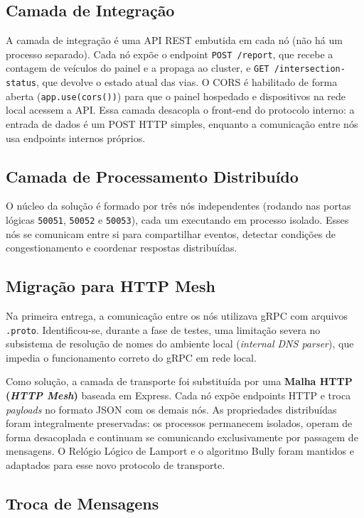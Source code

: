 \documentclass[12pt]{article}
\begin{document}
\subsection{Camada de Integração}

A camada de integração é uma API REST embutida em cada nó (não há um processo separado). Cada nó expõe o endpoint \texttt{POST /report}, que recebe a contagem de veículos do painel e a propaga ao cluster, e \texttt{GET /intersection-status}, que devolve o estado atual das vias. O CORS é habilitado de forma aberta (\texttt{app.use(cors())}) para que o painel hospedado e dispositivos na rede local acessem a API. Essa camada desacopla o front-end do protocolo interno: a entrada de dados é um POST HTTP simples, enquanto a comunicação entre nós usa endpoints internos próprios.

\subsection{Camada de Processamento Distribuído}

O núcleo da solução é formado por três nós independentes (rodando nas portas lógicas \texttt{50051}, \texttt{50052} e \texttt{50053}), cada um executando em processo isolado. Esses nós se comunicam entre si para compartilhar eventos, detectar condições de congestionamento e coordenar respostas distribuídas.

\subsection{Migração para HTTP Mesh}

Na primeira entrega, a comunicação entre os nós utilizava gRPC com arquivos \texttt{.proto}. Identificou-se, durante a fase de testes, uma limitação severa no subsistema de resolução de nomes do ambiente local (\textit{internal DNS parser}), que impedia o funcionamento correto do gRPC em rede local.

Como solução, a camada de transporte foi substituída por uma \textbf{Malha HTTP (\textit{HTTP Mesh})} baseada em Express. Cada nó expõe endpoints HTTP e troca \textit{payloads} no formato JSON com os demais nós. As propriedades distribuídas foram integralmente preservadas: os processos permanecem isolados, operam de forma desacoplada e continuam se comunicando exclusivamente por passagem de mensagens. O Relógio Lógico de Lamport e o algoritmo Bully foram mantidos e adaptados para esse novo protocolo de transporte.

\subsection{Troca de Mensagens}
\end{document}
